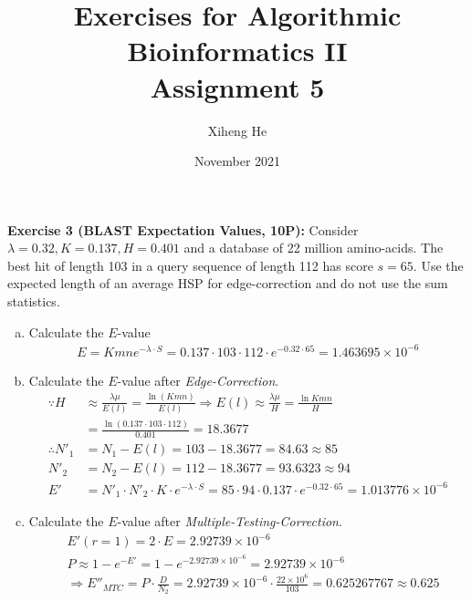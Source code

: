 \documentclass{article}
\title{Exercises for Algorithmic Bioinformatics II\\
Assignment 5}
\author{Xiheng He}
\date{November 2021}
\begin{document}
{\let\newpage\relax\maketitle}
\begin{flushleft}
\textbf{Exercise 3 (BLAST Expectation Values, 10P):}
\newline
Consider $\lambda = 0.32, K = 0.137, H = 0.401$ and a database of 22 million amino-acids. The best hit
of length 103 in a query sequence of length 112 has score $s = 65$.
\newline
Use the expected length of an average HSP for edge-correction and do not use the sum statistics.
\begin{enumerate}[(a)]
    \item Calculate the $E$-value
    \newline
    \begin{align*}
        E = Kmne^{-\lambda \cdot S} = 0.137 \cdot 103 \cdot 112 \cdot e^{-0.32 \cdot 65} = 1.463695 \times 10^{-6}
    \end{align*}
    \item Calculate the $E$-value after \textit{Edge-Correction}.
    \begin{align*}
        \because H &\approx \frac{\lambda \mu}{E(l)} = \frac{\ln (Kmn)}{E(l)} \Longrightarrow E(l) \approx \frac{\lambda \mu}{H} = \frac{\ln {Kmn}}{H} \\
        &= \frac{\ln(0.137 \cdot 103 \cdot 112)}{0.401} = 18.3677 \\
        \therefore N'_1 &= N_1 - E(l) = 103 - 18.3677 = 84.63 \approx 85 \\
        N'_2 &= N_2 - E(l) = 112 - 18.3677 = 93.6323 \approx 94 \\
        E' &= N'_1 \cdot N'_2 \cdot K \cdot e^{-\lambda \cdot S} = 85 \cdot 94 \cdot 0.137 \cdot e^{-0.32 \cdot 65} = 1.013776 \times 10^{-6}
    \end{align*}
    \item Calculate the $E$-value after \textit{Multiple-Testing-Correction}.
    \begin{align*}
        &E'(r = 1) = 2 \cdot E = 2.92739 \times 10^{-6} \\
        &P \approx 1 - e^{-E'} = 1 - e^{-2.92739 \times 10^{-6}} =2.92739 \times 10^{-6} \\
        &\Longrightarrow E''_{MTC} = P \cdot \frac{D}{N_2} = 2.92739 \times 10^{-6} \cdot \frac{22 \times 10^6}{103} = 0.625267767 \approx 0.625   

\end{align*}
\end{enumerate}
\end{flushleft}
\end{document}
